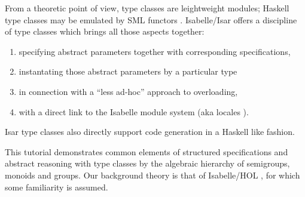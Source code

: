 \begin{isabellebody}
\begin{isamarkuptext}
  \medskip\noindent From a theoretic point of view, type classes are leightweight
  modules; Haskell type classes may be emulated by
  SML functors \cite{classes_modules}. 
  Isabelle/Isar offers a discipline of type classes which brings
  all those aspects together:

  \begin{enumerate}
    \item specifying abstract parameters together with
       corresponding specifications,
    \item instantating those abstract parameters by a particular
       type
    \item in connection with a ``less ad-hoc'' approach to overloading,
    \item with a direct link to the Isabelle module system
      (aka locales \cite{kammueller-locales}).
  \end{enumerate}

  \noindent Isar type classes also directly support code generation
  in a Haskell like fashion.

  This tutorial demonstrates common elements of structured specifications
  and abstract reasoning with type classes by the algebraic hierarchy of
  semigroups, monoids and groups.  Our background theory is that of
  Isabelle/HOL \cite{isa-tutorial}, for which some
  familiarity is assumed.


\end{isamarkuptext}
\end{isabellebody}
